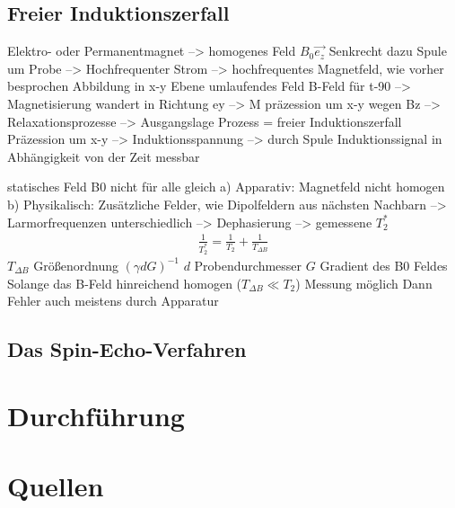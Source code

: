\documentclass[]{scrartcl}
\begin{document}
\subsection{Freier Induktionszerfall}
Elektro- oder Permanentmagnet --> homogenes Feld $B_0\vec{e_z}$ 
Senkrecht dazu Spule um Probe --> Hochfrequenter Strom --> hochfrequentes Magnetfeld, wie vorher besprochen
Abbildung
in x-y Ebene umlaufendes Feld
B-Feld für t-90 --> Magnetisierung wandert in Richtung ey --> M präzession um x-y wegen Bz --> Relaxationsprozesse --> Ausgangslage
Prozess = freier Induktionszerfall
Präzession um x-y --> Induktionsspannung --> durch Spule Induktionssignal in Abhängigkeit von der Zeit messbar


statisches Feld B0 nicht für alle gleich
a) Apparativ: Magnetfeld nicht homogen
b) Physikalisch: Zusätzliche Felder, wie Dipolfeldern aus nächsten Nachbarn
--> Larmorfrequenzen unterschiedlich --> Dephasierung --> gemessene $T_2^*$
\begin{align}
\frac{1}{T_2^*}=\frac{1}{T_2}+\frac{1}{T_{\Delta B}}
\end{align}
$T_{\Delta B}$ Größenordnung $\left(\gamma d G\right)^{-1}$ $d$ Probendurchmesser $G$ Gradient des B0 Feldes
Solange das B-Feld hinreichend homogen ($T_{\Delta B} \ll T_2$) Messung möglich
Dann Fehler auch meistens durch Apparatur
\subsection{Das Spin-Echo-Verfahren}

\section{Durchführung}


\section{Quellen}
\end{document}
